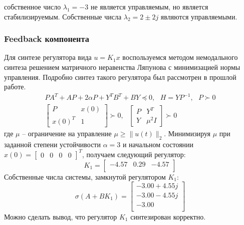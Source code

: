 собственное число $\lambda_1 = -3$ не является управляемым, но является стабилизируемым. 
Собственные числа $\lambda_2 = 2 \pm 2j$ являются управляемыми. 

\subsubsection{Feedback компонента}
Для синтезе регулятора вида $u = K_1x$ воспользуемся методом немодального синтеза решением матричного неравенства Ляпунова с 
минимизацией нормы управления. Подробно синтез такого регулятора был рассмотрен в прошлой работе. 
\begin{equation}
    \begin{array}{cc}
        PA^T + AP + 2\alpha P + Y^T B^T + BY \preceq 0, ~~~ H = Y P^{-1}, ~~~ P \succ 0 \\ 
        \begin{bmatrix}
            P & x(0) \\
            x(0)^T & 1
        \end{bmatrix} \succ 0, ~~~ \begin{bmatrix}
            P & Y^T \\ 
            Y & \mu^2I
        \end{bmatrix} \succ 0
    \end{array}
\end{equation} 
где $\mu$ -- ограничение на управление $\mu \ge \|u(t)\|_2$.
Минимизируя $\mu$ при заданной степени устойчивости $\alpha = 3$ и начальном 
состоянии $x(0) = \begin{bmatrix}0 & 0 & 0 & 0\end{bmatrix}^T$, получаем следующий регулятор: 
\begin{equation}
    K_1 = \begin{bmatrix}
        -4.57  & 0.29  & -4.57 \\ 
    \end{bmatrix}
    \label{eq:K1}
\end{equation}
Собственные числа системы, замкнутой регулятором $K_1$:
\begin{equation}
    \sigma(A + BK_1) = \begin{bmatrix}
        -3.00 + 4.55j \\ 
        -3.00 - 4.55j \\ 
        -3.00 \\ 
    \end{bmatrix}
\end{equation}
Можно сделать вывод, что регулятор $K_1$ синтезирован корректно. 
